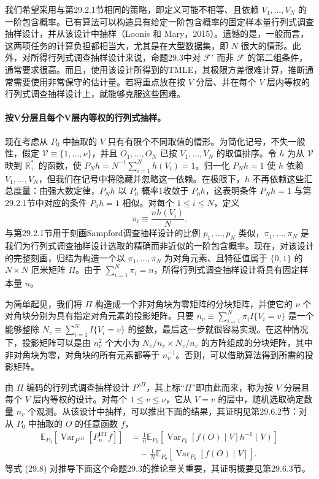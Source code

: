 我们希望采用与第29.2.1节相同的策略，即定义可能不相等、且依赖 $V_1,\ldots,V_N$ 的一阶包含概率。已有算法可以构造具有给定一阶包含概率的固定样本量行列式调查抽样设计，并从该设计中抽样（Loonis 和 Mary，2015）。遗憾的是，一般而言，这两项任务的计算负担都相当大，尤其是在大型数据集，即 $N$ 很大的情形。此外，对所得行列式调查抽样设计来说，命题29.3中对 $\mathcal F'$ 而非 $\mathcal F$ 的第二组条件，通常要求很高。而且，使用该设计所得到的TMLE，其极限方差很难计算，推断通常需要使用非常保守的估计量。若将重点放在按 $V$ 分层、并在每个 $V$ 层内等权的行列式调查抽样设计上，就能够克服这些困难。

\paragraph{按V分层且每个V层内等权的行列式抽样。}
现在考虑从 $P_0$ 中抽取的 $V$ 只有有限个不同取值的情形。为简化记号，不失一般性，假定 $\mathcal V\equiv\{1,\ldots,\nu\}$，并且 $O_1,\ldots,O_N$ 已按 $V_1,\ldots,V_N$ 的取值排序。令 $h$ 为从 $\mathcal V$ 映到 $\mathbb R_+^*$ 的函数，使 $P_Nh=N^{-1}\sum_{i=1}^Nh(V_i)=1$。归一化 $P_Nh=1$ 使 $h$ 依赖 $V_1,\ldots,V_N$，但我们在记号中将隐藏并忽略这一依赖。在极限下，$h$ 不再依赖这些汇总度量：由强大数定律，$P_Nh$ 以 $P_0$ 概率1收敛于 $P_0h$，这表明条件 $P_Nh=1$ 与第29.2.1节中对应的条件 $P_0h=1$ 相似。对每个 $1\le i\le N$，定义
\[
\pi_i\equiv\frac{nh(V_i)}N.
\]
与第29.2.1节用于刻画Sampford调查抽样设计的比例 $p_1,\ldots,p_N$ 类似，$\pi_1,\ldots,\pi_N$ 是我们为行列式调查抽样设计选取的精确而非近似的一阶包含概率。现在，对该设计的完整刻画，归结为构造一个以 $\pi_1,\ldots,\pi_N$ 为对角元素、且特征值属于 $\{0,1\}$ 的 $N\times N$ 厄米矩阵 $\Pi$。由于 $\sum_{i=1}^N\pi_i=n$，所得行列式调查抽样设计将具有固定样本量 $n$。

为简单起见，我们将 $\Pi$ 构造成一个非对角块为零矩阵的分块矩阵，并使它的 $\nu$ 个对角块分别为具有指定对角元素的投影矩阵。只要 $n_v\equiv\sum_{i=1}^N\pi_iI\{V_i=v\}$ 是一个能够整除 $N_v\equiv\sum_{i=1}^NI\{V_i=v\}$ 的整数，最后这一步就很容易实现。在这种情况下，投影矩阵可以是由 $n_v^2$ 个大小为 $N_v/n_v\times N_v/n_v$ 的方阵组成的分块矩阵，其中非对角块为零，对角块的所有元素都等于 $n_v^{-1}$。否则，可以借助算法得到所需的投影矩阵。

由 $\Pi$ 编码的行列式调查抽样设计 $P^{s\Pi}$，其上标“$\Pi$”即由此而来，称为按 $V$ 分层且每个 $V$ 层内等权的设计。对每个 $1\le v\le\nu$，它从 $V=v$ 的层中，随机选取确定数量 $n_v$ 个观测。从该设计中抽样，可以推出下面的结果，其证明见第29.6.2节：对从 $P_0$ 中抽取的 $O$ 的任意函数 $f$，
\begin{equation}
\begin{aligned}
\mathbb E_{P_0}\!\left[\operatorname{Var}_{P^{s\Pi}}\!\left[P_n^{\mathrm{HT}}f\right]\right]
&=\frac1n\mathbb E_{P_0}\!\left[\operatorname{Var}_{P_0}[f(O)\mid V]h^{-1}(V)\right]\\
&\quad-\frac1N\mathbb E_{P_0}\!\left[\operatorname{Var}_{P_0}[f(O)\mid V]\right].
\end{aligned}
\tag{29.8}
\end{equation}
等式 (29.8) 对推导下面这个命题29.3的推论至关重要，其证明概要见第29.6.3节。

